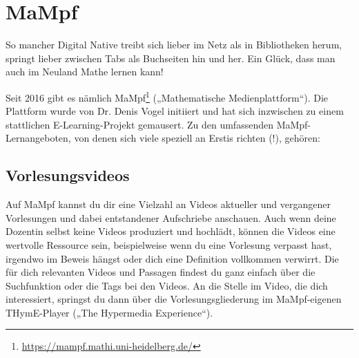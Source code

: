 \section{MaMpf}
\label{mampf}

\noindent So mancher Digital Native treibt sich lieber im Netz als in Bibliotheken herum, springt lieber zwischen Tabs als Buchseiten hin und her. Ein Glück, dass man auch im Neuland Mathe lernen kann!

\begin{figure}
\vspace{-3mm} %
\hspace*{-7mm}
\end{figure}

Seit 2016 gibt es nämlich MaMpf\footnote{\url{https://mampf.mathi.uni-heidelberg.de/}} („Mathematische Medienplattform“). Die Plattform wurde von Dr. Denis Vogel initiiert und hat sich inzwischen zu einem stattlichen E-Learning-Projekt gemausert. Zu den umfassenden MaMpf-Lernangeboten, von denen sich viele speziell an Erstis richten (!), gehören: 
 
\subsection{Vorlesungsvideos}
Auf MaMpf kannst du dir eine Vielzahl an Videos aktueller und vergangener Vorlesungen und dabei entstandener Aufschriebe anschauen. Auch wenn deine Dozentin selbst keine Videos produziert und hochlädt, können die Videos eine wertvolle Ressource sein, beispielweise wenn du eine Vorlesung verpasst hast, irgendwo im Beweis hängst oder dich eine Definition vollkommen verwirrt. Die für dich relevanten Videos und Passagen findest du ganz einfach über die Suchfunktion oder die Tags bei den Videos. An die Stelle im Video, die dich interessiert, springst du dann über die Vorlesungsgliederung im MaMpf-eigenen THymE-Player („The Hypermedia Experience“).

